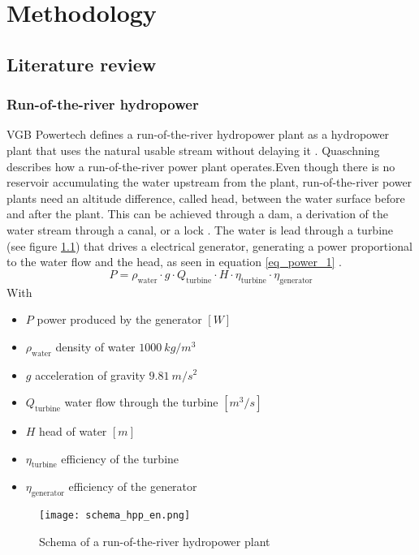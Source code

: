 \chapter{Methodology}
\label{chap:methodology}

\section{Literature review}
\subsection{Run-of-the-river hydropower}
VGB Powertech defines a run-of-the-river hydropower plant as a hydropower plant that uses the natural usable stream without delaying it \cite{vgb}. \newline
Quaschning \cite{quaschning} describes how a run-of-the-river power plant operates.Even though there is no reservoir accumulating the water upstream from the plant, run-of-the-river power plants need an altitude difference, called head, between the water surface before and after the plant. This can be achieved through a dam, a derivation of the water stream through a canal, or a lock \cite{tdi_petites_centrales}. The water is lead through a turbine (see figure \ref{schema_hpp}) that drives a electrical generator, generating a power proportional to the water flow and the head, as seen in equation \ref{eq_power_1} \cite{quaschning}.
\begin{equation}
\label{eq_power_1} 
 P = \rho_\mathrm{water} \cdot g \cdot Q_\mathrm{turbine} \cdot H \cdot \eta_\mathrm{turbine} \cdot \eta_\mathrm{generator}
\end{equation}
With 
\begin{itemize}
\itemsep0em 
 \item $P$ \tabto{4cm} power produced by the generator \tabto{12cm} $[W]$
 \item $\rho_\mathrm{water}$ \tabto{4cm} density of water \tabto{12cm} $1000 \ kg/m^3$
 \item $g$ \tabto{4cm} acceleration of gravity \tabto{12cm} $9.81 \ m/s^2$
 \item $Q_\mathrm{turbine}$ \tabto{4cm} water flow through the turbine \tabto{12cm} $[m^3/s]$
 \item $H$ \tabto{4cm} head of water \tabto{12cm} $[m]$
 \item $\eta_\mathrm{turbine}$ \tabto{4cm} efficiency of the turbine
 \item $\eta_\mathrm{generator}$ \tabto{4cm} efficiency of the generator
\end{itemize}
\begin{figure}[h]
\texttt{[image: schema\_hpp\_en.png]}
\caption[Schema of a run-of-the-river hydropower plant]{Schema of a run-of-the-river hydropower plant \cite{quaschning}}
\centering
\label{schema_hpp}
\end{figure}

